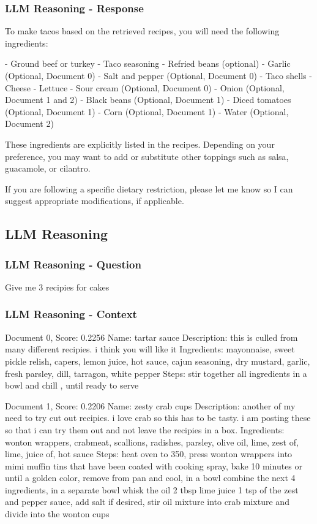 \documentclass[a4paper,11pt]{article}
\begin{document}
\subsubsection{LLM Reasoning - Response}
To make tacos based on the retrieved recipes, you will need the following ingredients:

- Ground beef or turkey
- Taco seasoning
- Refried beans (optional)
- Garlic (Optional, Document 0)
- Salt and pepper (Optional, Document 0)
- Taco shells
- Cheese
- Lettuce
- Sour cream (Optional, Document 0)
- Onion (Optional, Document 1 and 2)
- Black beans (Optional, Document 1)
- Diced tomatoes (Optional, Document 1)
- Corn (Optional, Document 1)
- Water (Optional, Document 2)

These ingredients are explicitly listed in the recipes. Depending on your preference, you may want to add or substitute other toppings such as salsa, guacamole, or cilantro.

If you are following a specific dietary restriction, please let me know so I can suggest appropriate modifications, if applicable.

\subsection{LLM Reasoning}
\subsubsection{LLM Reasoning - Question}
Give me 3 recipies for cakes

\subsubsection{LLM Reasoning - Context}
Document 0, Score: 0.2256
Name: tartar sauce
Description: this is culled from many different recipies.  i think you will like it
Ingredients: mayonnaise, sweet pickle relish, capers, lemon juice, hot sauce, cajun seasoning, dry mustard, garlic, fresh parsley, dill, tarragon, white pepper
Steps: stir together all ingredients in a bowl and chill , until ready to serve

Document 1, Score: 0.2206
Name: zesty crab cups
Description: another of my need to try cut out recipies. i love crab so this has to be tasty. i am posting these so  that i can try them out and not leave the recipies in a box.
Ingredients: wonton wrappers, crabmeat, scallions, radishes, parsley, olive oil, lime, zest of, lime, juice of, hot sauce
Steps: heat oven to 350, press wonton wrappers into mimi muffin tins that have been coated with cooking spray, bake 10 minutes or until a golden color, remove from pan and cool, in a bowl combine the next 4 ingredients, in a separate bowl whisk the oil 2 tbsp lime juice 1 tsp of the zest and pepper sauce, add salt if desired, stir oil mixture into crab mixture and divide into the wonton cups
\end{document}
